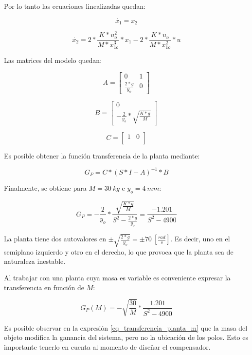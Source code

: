 \noindent Por lo tanto las ecuaciones linealizadas quedan:

\begin{equation}
	\dot{x_{1}}=x_{2}
\end{equation}

\begin{equation}
	\dot{x_{2}}=2*\frac{K*u_{o}^{2}}{M*x_{1o}^{3}}*x_{1}-2*\frac{K*u_{o}}{M*x_{1o}^{2}}*u
\end{equation}

\noindent Las matrices del modelo quedan:

\begin{equation}
	A=\begin{bmatrix}
		0 & 1\\
		\frac{2*g}{y_{o}} & 0
	\end{bmatrix}
\end{equation}

\begin{equation}
	B=\begin{bmatrix}
		0\\
		-\frac{2}{y_{o}}*\sqrt{\frac{K*g}{M}}
	\end{bmatrix}
\end{equation}

\begin{equation}
	C=\begin{bmatrix}
		1 & 0\\
	\end{bmatrix}
\end{equation}

\noindent Es posible obtener la función transferencia de la planta mediante:

\begin{equation}\label{eq_transferencia_planta}
	G_{P}=C*(S*I-A)^{-1}*B
\end{equation}

\noindent Finalmente, se obtiene para $M=30\:kg$ e $y_{o}=4\:mm$:

\begin{equation} \label{eq_transferencia_planta_30kg}
	G_{P}=-\frac{2}{y_{o}}*\frac{\sqrt{\frac{K*g}{M}}}{S^2-\frac{2*g}{y_{o}}}=\frac{-1.201}{S^{2}-4900}
\end{equation}

\noindent La planta tiene dos autovalores en $\pm\sqrt{\frac{2*g}{y_{o}}}=\pm70\:[\frac{rad}{s}]$. Es decir, uno en el semiplano izquierdo y otro en el derecho, lo que provoca que la planta sea de naturaleza inestable.

\noindent Al trabajar con una planta cuya masa es variable es conveniente expresar la transferencia en función de $M$:

\begin{equation} \label{eq_transferencia_planta_m}
		G_{P}(M)=-\sqrt{\frac{30}{M}}*\frac{1.201}{S^{2}-4900}
\end{equation}

\noindent Es posible observar en la expresión \ref{eq_transferencia_planta_m} que la masa del objeto modifica la ganancia del sistema, pero no la ubicación de los polos. Esto es importante tenerlo en cuenta al momento de diseñar el compensador.

